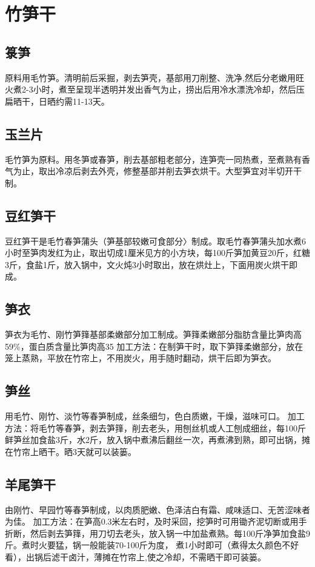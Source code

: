 \documentclass{ctexbook}
\begin{document}
\section{竹笋干}
\subsection{箓笋}
原料用毛竹笋。清明前后采掘，剥去笋壳，基部用刀削整、洗净,然后分老嫩用旺火煮2-3小时，煮至呈现半透明并发出香气为止，捞出后用冷水漂洗冷却，然后压扁晒干，日晒约需11-13天。
\subsection{玉兰片}
毛竹笋为原料。用冬笋或春笋，削去基部粗老部分，连笋壳一同热煮，至煮熟有香气为止，取出冷凉后剥去外壳，修整基部并削去笋衣烘干。大型笋宜对半切开干制。
\subsection{豆红笋干}
豆红笋干是毛竹春笋蒲头（笋基部较嫩可食部分〉制成。取毛竹春笋蒲头加水煮6小时至笋肉发红为止，取出切成1厘米见方的小方块，每100斤笋加黄豆20斤，红糖3斤，食盐1斤，放入锅中，文火炖3小时取出，放在烘灶上，下面用炭火烘干即成。
\subsection{笋衣}
笋衣为毛竹、刚竹笋箨基部柔嫩部分加工制成。笋箨柔嫩部分脂肪含量比笋肉高59\%，蛋白质含量比笋肉高35%
加工方法：在制笋干时，取下笋箨柔嫩部分，放在笼上蒸熟，平放在竹帘上，不用炭火，用手随时翻动，烘干后即为笋衣。
\subsection{笋丝}
用毛竹、刚竹、淡竹等春笋制成，丝条细匀，色白质嫩，干燥，滋味可口。
加工方法：将毛竹等春笋，剥去笋箨，削去老头，用刨丝机或人工刨成细丝，每100斤鲜笋丝加食盐3斤，水2斤，放入锅中煮沸后翻丝一次，再煮沸到熟，即可出锅，摊在竹帘上晒干。晒3天就可以装篓。
\subsection{羊尾笋干}
由刚竹、早园竹等春笋制成，以肉质肥嫩、色泽洁白有霜、咸味适口、无苦涩味者为佳。
加工方法：在笋高0.3米左右时，及时采回，挖笋时可用锄齐泥切断或用手折断，然后剥去笋箨，用刀切去老头，放入锅一中加盐煮熟。每100斤净笋加食盐9斤。煮时火要猛，锅一般能装70-100斤为度，
煮1小时即可（煮得太久颜色不好看），出锅后滤干卤汁，薄摊在竹帘上,使之冷却，不需晒干即可装篓。
\end{document}
